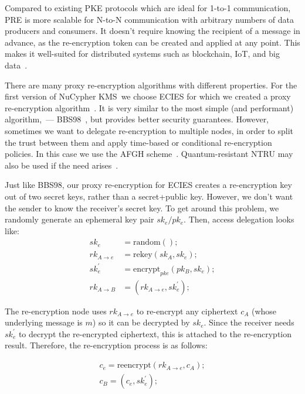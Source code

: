 \documentclass[longbibliography,nofootinbib]{revtex4-1}
\newcommand{\kms}{NuCypher KMS}
\begin{document}
\begin{CJK*}{UTF8}{gbsn}
Compared to existing PKE protocols which are ideal for 1-to-1 communication, PRE is more scalable for N-to-N communication
with arbitrary numbers of data producers and consumers.
It doesn't require knowing the recipient of a message in advance, as the re-encryption token can be created and applied at any point.
This makes it well-suited for distributed systems such as blockchain, IoT, and big data~\cite{web:nucypher-hadoop}.

There are many proxy re-encryption algorithms with different properties.
For the first version of \kms~we choose ECIES for which we created a proxy re-encryption algorithm~\cite{umbral-spec}.
It is very similar to the most simple (and performant) algorithm,~--- BBS98~\cite{BBS98}, but provides better security guarantees.
However, sometimes we want to delegate re-encryption to multiple nodes, in order to split the trust between them and apply time-based or conditional
re-encryption policies.
In this case we use the AFGH scheme~\cite{AFGH}.
Quantum-resistant NTRU may also be used if the need arises~\cite{wiki:ntru,ntrureencrypt}.

Just like BBS98, our proxy re-encryption for ECIES creates a re-encryption key out of two secret keys, rather than a secret+public key.
However, we don't want the sender to know the receiver's secret key.
To get around this problem, we randomly generate an ephemeral key pair $sk_e/pk_e$.
Then, access delegation looks like:
\begin{align}
    \label{eq:ephemeral-trick}
    sk_e &= \text{random}();\\
    rk_{A\rightarrow e} &= \text{rekey}(sk_A, sk_e);\\
    \label{eq:ephemeral-trick-end}
    sk_e^{\prime} &= \text{encrypt}_{pke}(pk_B, sk_e);\\
    rk_{A\rightarrow B} &= (rk_{A\rightarrow e}, sk_e^{\prime});
\end{align}

The re-encryption node uses $rk_{A\rightarrow e}$ to re-encrypt any ciphertext $c_A$ (whose underlying message is $m$) so it can be decrypted by $sk_e$. Since the receiver needs $sk_e^{\prime}$ to decrypt the re-encrypted ciphertext, this is attached to the re-encryption result. Therefore, the re-encryption process is as follows:

\begin{align}
    c_e = \text{reencrypt}(rk_{A\rightarrow e}, c_{A});\\
    c_B = (c_e, sk_e^{\prime});\\
\end{align}


\end{CJK*}
\end{document}
